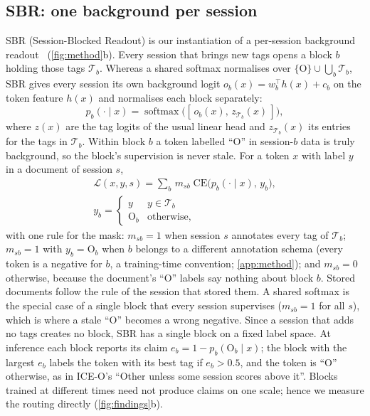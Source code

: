 \documentclass[10pt,twocolumn,letterpaper]{article}
\begin{document}
\subsection{SBR: one background per session}
\label{sec:sbr}
SBR (Session-Blocked Readout) is our instantiation of a per-session background readout~\citep{liu2023ice,kim2022more} (\cref{fig:method}b). Every session that brings new tags opens a block $b$ holding those tags $\mathcal{T}_b$. Whereas a shared softmax normalises over $\{\mathrm{O}\}\cup\bigcup_b\mathcal{T}_b$, SBR gives every session its own background logit $o_b(x)=w_b^{\top}h(x)+c_b$ on the token feature $h(x)$ and normalises each block separately:
\begin{equation}
p_b(\cdot\mid x)=\operatorname{softmax}\big([\,o_b(x),\,z_{\mathcal{T}_b}(x)\,]\big),
\label{eq:block}
\end{equation}
where $z(x)$ are the tag logits of the usual linear head and $z_{\mathcal{T}_b}(x)$ its entries for the tags in $\mathcal{T}_b$. Within block $b$ a token labelled ``O'' in session-$b$ data is truly background, so the block's supervision is never stale. For a token $x$ with label $y$ in a document of session $s$,
\begin{equation}
\begin{gathered}
\mathcal{L}(x,y,s)=\sum_{b}\,m_{sb}\;\mathrm{CE}\big(p_b(\cdot\mid x),\,y_b\big),\\
y_b=\begin{cases} y & y\in\mathcal{T}_b\\ \mathrm{O}_b & \text{otherwise,}\end{cases}
\end{gathered}
\label{eq:sbr}
\end{equation}
with one rule for the mask: $m_{sb}{=}1$ when session $s$ annotates every tag of $\mathcal{T}_b$; $m_{sb}{=}1$ with $y_b{=}\mathrm{O}_b$ when $b$ belongs to a different annotation schema (every token is a negative for $b$, a training-time convention; \cref{app:method}); and $m_{sb}{=}0$ otherwise, because the document's ``O'' labels say nothing about block $b$. Stored documents follow the rule of the session that stored them. A shared softmax is the special case of a single block that every session supervises ($m_{sb}{=}1$ for all $s$), which is where a stale ``O'' becomes a wrong negative. Since a session that adds no tags creates no block, SBR has a single block on a fixed label space. At inference each block reports its claim $e_b=1-p_b(\mathrm{O}_b\mid x)$; the block with the largest $e_b$ labels the token with its best tag if $e_b>0.5$, and the token is ``O'' otherwise, as in ICE-O's ``Other unless some session scores above it''. Blocks trained at different times need not produce claims on one scale; hence we measure the routing directly (\cref{fig:findings}b).
\end{document}
